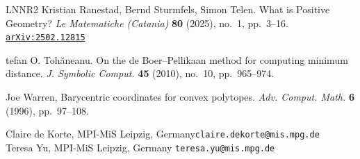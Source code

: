 \documentclass [a4paper,reqno, 11pt]{amsart}
\theoremstyle{plain}
\theoremstyle{plain}
\theoremstyle{plain}
\theoremstyle{plain}
\theoremstyle{definition}
\theoremstyle{definition}
\theoremstyle{definition}
\theoremstyle{definition}
\theoremstyle{definition}
\theoremstyle{definition}
\newcommand{\arxiv}[1]{\href{http://arxiv.org/abs/#1}{{\tt arXiv:#1}}}
\begin{document}
\begin{thebibliography}{LNNR2}
Kristian Ranestad, Bernd Sturmfels, Simon Telen. What is Positive Geometry? \textit{Le Matematiche (Catania)} \textbf{80} (2025), no.~1, pp.~3--16. \arxiv{2502.12815}

tefan O. Toh\u{a}neanu. On the de Boer--Pellikaan method for computing minimum distance. \textit{J. Symbolic Comput.} \textbf{45} (2010), no.~10, pp.~965--974.


Joe Warren, Barycentric coordinates for convex polytopes. \textit{Adv. Comput. Math.} \textbf{6} (1996), pp.~97--108.












\end{thebibliography}

\vspace{1em}


\noindent 
Claire de Korte, MPI-MiS Leipzig, Germany\hfill{\texttt{claire.dekorte@mis.mpg.de}}\\
Teresa Yu, MPI-MiS Leipzig, Germany \hfill{\texttt{teresa.yu@mis.mpg.de}}
\end{document}
